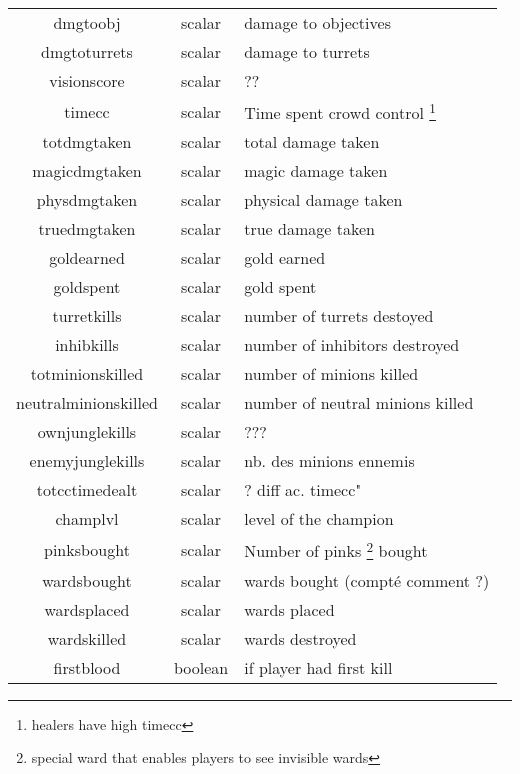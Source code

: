 \begin{longtable}{|c|c|l|}
        dmgtoobj                    & scalar          & damage to objectives\\
        dmgtoturrets                & scalar          & damage to turrets\\
        visionscore                 & scalar          & ??\\
        timecc                      & scalar          & Time spent  crowd control \footnote{healers have high timecc}\\
        totdmgtaken                 & scalar          & total damage taken\\
        magicdmgtaken               & scalar          & magic damage taken\\
        physdmgtaken                & scalar          & physical damage taken\\
        truedmgtaken                & scalar          & true damage taken\\
        goldearned                  & scalar          & gold earned\\
        goldspent                   & scalar          & gold spent\\
        turretkills                 & scalar          & number of turrets destoyed\\
        inhibkills                  & scalar          & number of inhibitors destroyed\\
        totminionskilled            & scalar          & number of minions killed\\
        neutralminionskilled        & scalar          & number of neutral minions killed\\
        ownjunglekills              & scalar          & ???\\
        enemyjunglekills            & scalar          & nb. des minions ennemis \\
        totcctimedealt              & scalar          & ? diff ac. timecc"\\
        champlvl                    & scalar          & level of the champion\\
        pinksbought                 & scalar          & Number of pinks \footnote{special ward that enables players to see invisible wards}  bought\\
        wardsbought                 & scalar          & wards bought (compté comment ?)\\
        wardsplaced                 & scalar          & wards placed\\
        wardskilled                 & scalar          & wards destroyed\\
        firstblood                  & boolean         & if player had first kill \\
        \hline
\end{longtable}
\newpage

